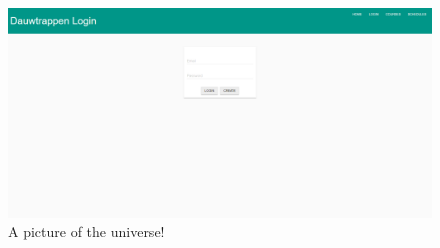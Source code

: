 \documentclass[twoside=false,a4paper,11pt]{article}
\theoremstyle{mytheor}
\begin{document}
\begin{center}
\begin{figure}[h!]
	\caption{A picture of the universe!}
	\includegraphics[width=\textwidth]{loginBlank.png} 
\end{figure}


\end{center}
\end{document}
